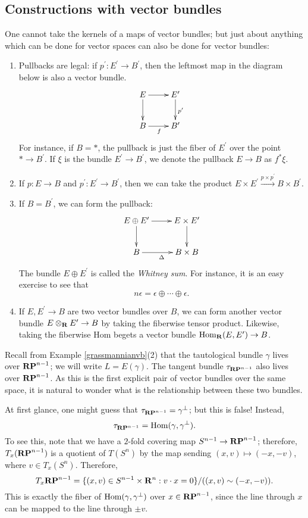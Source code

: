 \subsection{Constructions with vector bundles}
One cannot take the kernels of a maps of vector bundles; but just about
anything which can be done for vector spaces can also be done for vector
bundles:
\begin{enumerate}
    \item Pullbacks are legal: if $p^\prime:E^\prime\to B^\prime$, then the
	leftmost map in the diagram below is also a vector bundle.
	\begin{equation*}
	    \xymatrix{
		E\ar[r]\ar[d] & E^\prime\ar[d]^{p^\prime}\\
		B\ar[r]_f & B^\prime
		}
	\end{equation*}
	For instance, if $B=\ast$, the pullback is just the fiber of $E^\prime$
	over the point $\ast\to B^\prime$. If $\xi$ is the bundle $E^\prime\to
	B^\prime$, we denote the pullback $E\to B$ as $f^\ast \xi$.
    \item If $p:E\to B$ and $p^\prime:E^\prime\to B^\prime$, then we can take
	the product $E\times E^\prime\xrightarrow{p\times p^\prime}B\times
	B^\prime$.
    \item If $B=B^\prime$, we can form the pullback:
	\begin{equation*}
	    \xymatrix{
		E\oplus E^\prime\ar[r]\ar[d] & E\times E^\prime\ar[d]\\
		B\ar[r]_{\Delta} & B\times B
		}
	\end{equation*}
	The bundle $E\oplus E^\prime$ is called the \emph{Whitney sum}. For
	instance, it is an easy exercise to see that
	$$n\epsilon = \epsilon\oplus\cdots\oplus\epsilon.$$
    \item If $E,E^\prime\to B$ are two vector bundles over $B$, we can form
	another vector bundle $E\otimes_\mathbf R E^\prime\to B$ by taking the
	fiberwise tensor product. Likewise, taking the fiberwise Hom begets a
	vector bundle $\operatorname{Hom}_\mathbf R(E,E^\prime)\to B$.
\end{enumerate}
\begin{example}
    Recall from Example \ref{grassmannianvb}(2) that the tautological bundle
    $\gamma$ lives over $\mathbf{RP}^{n-1}$; we will write $L = E(\gamma)$. The tangent
    bundle $\tau_{\mathbf{RP}^{n-1}}$ also lives over $\mathbf{RP}^{n-1}$. As this is the first
    explicit pair of vector bundles over the same space, it is natural to
    wonder what is the relationship between these two bundles.
    
    At first glance, one might guess that $\tau_{\mathbf{RP}^{n-1}} = \gamma^\perp$;
    but this is false! Instead,
    $$\tau_{\mathbf{RP}^{n-1}} = \operatorname{Hom}(\gamma,\gamma^\perp).$$
    To see this, note that we have a $2$-fold covering map $S^{n-1}\to
    \mathbf{RP}^{n-1}$; therefore, $T_x(\mathbf{RP}^{n-1})$ is a quotient of $T(S^n)$ by the
    map sending $(x,v)\mapsto (-x,-v)$, where $v\in T_x(S^n)$. Therefore,
    $$T_x\mathbf{RP}^{n-1} = \{(x,v)\in S^{n-1}\times\mathbf R^n:v\cdot x =
    0\}/((x,v)\sim(-x,-v)).$$
    This is exactly the fiber of $\operatorname{Hom}(\gamma,\gamma^\perp)$ over $x\in
    \mathbf{RP}^{n-1}$, since the line through $x$ can be mapped to the line through
    $\pm v$.
\end{example}
